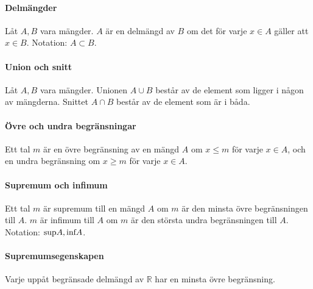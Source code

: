 \paragraph{Delmängder}

Låt $A, B$ vara mängder. $A$ är en delmängd av $B$ om det för varje $x \in A$ gäller att $x \in B$. Notation: $A \subset B$.

\paragraph{Union och snitt}

Låt $A, B$ vara mängder. Unionen $A \cup B$ består av de element som ligger i någon av mängderna. Snittet $A \cap B$ består av de element som är i båda.

\paragraph{Övre och undra begränsningar}

Ett tal $m$ är en övre begränsning av en mängd $A$ om $x \leq m$ för varje $x \in A$, och en undra begränsning om $x \geq m$ för varje $x \in A$.

\paragraph{Supremum och infimum}

Ett tal $m$ är supremum till en mängd $A$ om $m$ är den minsta övre begränsningen till $A$. $m$ är infimum till $A$ om $m$ är den största undra begränsningen till $A$. Notation: $\textnormal{sup}A, \textnormal{inf}A$.

\paragraph{Supremumsegenskapen}

Varje uppåt begränsade delmängd av $\mathbb{R}$ har en minsta övre begränsning.